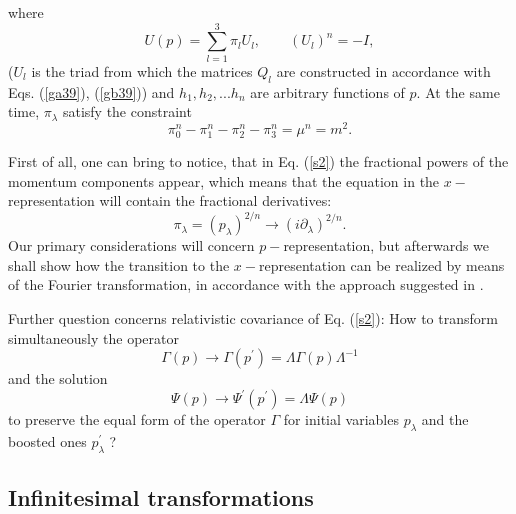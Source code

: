 \documentclass[a4paper,a4paper]{article}
\begin{document}
where 
\begin{equation*}
U(p)=\sum_{l=1}^{3}\pi _{l}U_{l},\qquad \left( U_{l}\right) ^{n}=-I,
\end{equation*}%
($U_{l}$ is the triad from which the matrices $Q_{l}$ are constructed in
accordance with Eqs. (\ref{ga39}), (\ref{gb39})) and $h_{1},h_{2},...h_{n}$
are arbitrary functions of $p$. At the same time, $\pi _{\lambda }$ satisfy
the constraint 
\begin{equation}
\pi _{0}^{n}-\pi _{1}^{n}-\pi _{2}^{n}-\pi _{3}^{n}=\mu ^{n}=m^{2}.
\label{sb4}
\end{equation}

First of all, one can bring to notice, that in Eq. (\ref{s2}) the fractional
powers of the momentum components appear, which means that the equation in
the $x-$representation will contain the fractional derivatives: 
\begin{equation}
\pi _{\lambda }=(p_{\lambda })^{2/n}\rightarrow (i\partial _{\lambda
})^{2/n}.  \label{s5}
\end{equation}%
Our primary considerations will concern $p-$representation, but afterwards
we shall show how the transition to the $x-$representation can be realized
by means of the Fourier transformation, in accordance with the approach
suggested in \cite{zav}.

Further question concerns relativistic covariance of Eq. (\ref{s2}): How to
transform simultaneously the operator 
\begin{equation}
\Gamma (p)\rightarrow \Gamma (p^{\prime })=\Lambda \Gamma (p)\Lambda ^{-1}
\label{s6}
\end{equation}%
and the solution 
\begin{equation}
\Psi (p)\rightarrow \Psi ^{\prime }(p^{\prime })=\Lambda \Psi (p)  \label{s7}
\end{equation}%
to preserve the equal form of the operator $\Gamma $ for initial variables $%
p_{\lambda }$ and the boosted ones $p_{\lambda }^{\prime }$ ?

\subsection{Infinitesimal transformations}
\end{document}
